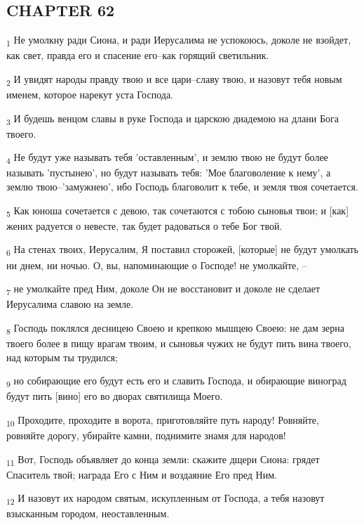 \subsection{CHAPTER 62}
\begin{tcolorbox}
\textsubscript{1} Не умолкну ради Сиона, и ради Иерусалима не успокоюсь, доколе не взойдет, как свет, правда его и спасение его--как горящий светильник.
\end{tcolorbox}
\begin{tcolorbox}
\textsubscript{2} И увидят народы правду твою и все цари--славу твою, и назовут тебя новым именем, которое нарекут уста Господа.
\end{tcolorbox}
\begin{tcolorbox}
\textsubscript{3} И будешь венцом славы в руке Господа и царскою диадемою на длани Бога твоего.
\end{tcolorbox}
\begin{tcolorbox}
\textsubscript{4} Не будут уже называть тебя 'оставленным', и землю твою не будут более называть 'пустынею', но будут называть тебя: 'Мое благоволение к нему', а землю твою--'замужнею', ибо Господь благоволит к тебе, и земля твоя сочетается.
\end{tcolorbox}
\begin{tcolorbox}
\textsubscript{5} Как юноша сочетается с девою, так сочетаются с тобою сыновья твои; и [как] жених радуется о невесте, так будет радоваться о тебе Бог твой.
\end{tcolorbox}
\begin{tcolorbox}
\textsubscript{6} На стенах твоих, Иерусалим, Я поставил сторожей, [которые] не будут умолкать ни днем, ни ночью. О, вы, напоминающие о Господе! не умолкайте, --
\end{tcolorbox}
\begin{tcolorbox}
\textsubscript{7} не умолкайте пред Ним, доколе Он не восстановит и доколе не сделает Иерусалима славою на земле.
\end{tcolorbox}
\begin{tcolorbox}
\textsubscript{8} Господь поклялся десницею Своею и крепкою мышцею Своею: не дам зерна твоего более в пищу врагам твоим, и сыновья чужих не будут пить вина твоего, над которым ты трудился;
\end{tcolorbox}
\begin{tcolorbox}
\textsubscript{9} но собирающие его будут есть его и славить Господа, и обирающие виноград будут пить [вино] его во дворах святилища Моего.
\end{tcolorbox}
\begin{tcolorbox}
\textsubscript{10} Проходите, проходите в ворота, приготовляйте путь народу! Ровняйте, ровняйте дорогу, убирайте камни, поднимите знамя для народов!
\end{tcolorbox}
\begin{tcolorbox}
\textsubscript{11} Вот, Господь объявляет до конца земли: скажите дщери Сиона: грядет Спаситель твой; награда Его с Ним и воздаяние Его пред Ним.
\end{tcolorbox}
\begin{tcolorbox}
\textsubscript{12} И назовут их народом святым, искупленным от Господа, а тебя назовут взысканным городом, неоставленным.
\end{tcolorbox}
